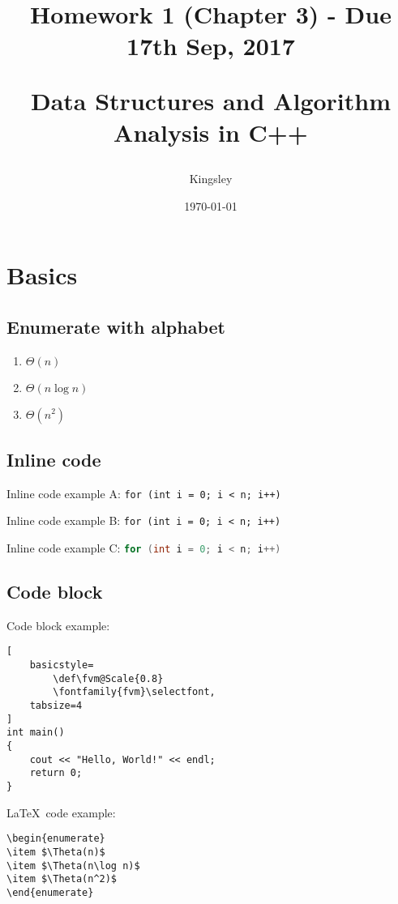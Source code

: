 \documentclass[titlepage]{article}
\title{
Homework 1 (Chapter 3) - Due 17th Sep, 2017\\
\begin{large}
Data Structures and Algorithm Analysis in C++
\end{large}
}
\author{Kingsley}
\date{\today}
\begin{document}
\maketitle

\clearpage
\tableofcontents
\clearpage

\section{Basics}
\subsection{Enumerate with alphabet}
\begin{enumerate}[label=(\alph*)]
\item $\Theta(n)$
\item $\Theta(n\log n)$
\item $\Theta(n^2)$
\end{enumerate}

\subsection{Inline code}

Inline code example A: \texttt{for (int i = 0; i < n; i++)}

Inline code example B: \lstinline{for (int i = 0; i < n; i++)}

Inline code example C: \lstinline[language=C++, keywordstyle={\bfseries \color{orange}}]{for (int i = 0; i < n; i++)}

\subsection{Code block}
\noindent Code block example:
\begin{lstlisting}[
	basicstyle=
		\def\fvm@Scale{0.8}
		\fontfamily{fvm}\selectfont,
	tabsize=4
]
int main()
{
	cout << "Hello, World!" << endl;
	return 0;
}
\end{lstlisting}

\noindent \LaTeX \, code example:
\begin{verbatim}
\begin{enumerate}
\item $\Theta(n)$
\item $\Theta(n\log n)$
\item $\Theta(n^2)$
\end{enumerate}
\end{verbatim}
\end{document}
